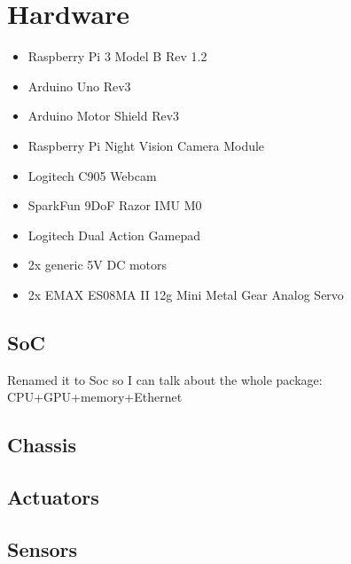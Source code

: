 \documentclass[class=article, crop=false]{standalone}
\begin{document}
\section{Hardware}\label{sec:hardware}
\begin{itemize}
 \item Raspberry Pi 3 Model B Rev 1.2
 \item Arduino Uno Rev3
 \item Arduino Motor Shield Rev3
 \item Raspberry Pi Night Vision Camera Module
 \item Logitech C905 Webcam
 \item SparkFun 9DoF Razor IMU M0
 \item Logitech Dual Action Gamepad
 \item 2x generic 5V DC motors
 \item 2x EMAX ES08MA II 12g Mini Metal Gear Analog Servo
\end{itemize}

\subsection{SoC}\label{subsec:soc}
Renamed it to Soc so I can talk about the whole package: \\
CPU+GPU+memory+Ethernet

\subsection{Chassis}\label{subsec:chassis}

\subsection{Actuators}\label{subsec:actuators}

\subsection{Sensors}\label{subsec:sensors}
\end{document}
